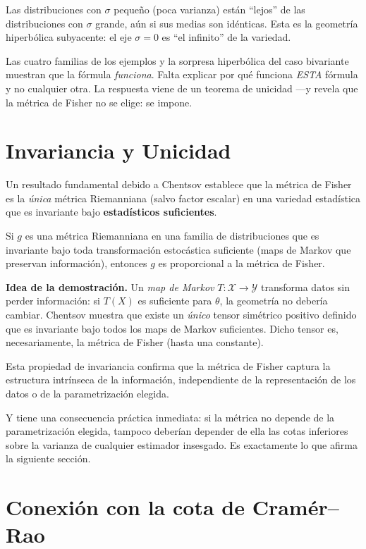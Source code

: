 Las distribuciones con $\sigma$ pequeño (poca varianza) están ``lejos'' de las distribuciones con $\sigma$ grande, aún si sus medias son idénticas. Esta es la geometría hiperbólica subyacente: el eje $\sigma = 0$ es ``el infinito'' de la variedad.

Las cuatro familias de los ejemplos y la sorpresa hiperbólica del caso bivariante muestran que la fórmula \emph{funciona}. Falta explicar por qué funciona \emph{ESTA} fórmula y no cualquier otra. La respuesta viene de un teorema de unicidad ---y revela que la métrica de Fisher no se elige: se impone.

\section{Invariancia y Unicidad}

Un resultado fundamental debido a Chentsov \cite{chentsov1982statistical} establece que la métrica de Fisher es la \emph{única} métrica Riemanniana (salvo factor escalar) en una variedad estadística que es invariante bajo \textbf{estadísticos suficientes}.

\begin{theorem}[Chentsov, 1972]
	Si $g$ es una métrica Riemanniana en una familia de distribuciones que es invariante bajo toda transformación estocástica suficiente (maps de Markov que preservan información), entonces $g$ es proporcional a la métrica de Fisher.
\end{theorem}

\textbf{Idea de la demostración.} Un \emph{map de Markov} $T : \mathcal{X} \to \mathcal{Y}$ transforma datos sin perder información: si $T(X)$ es suficiente para $\theta$, la geometría no debería cambiar. Chentsov muestra que existe un \emph{único} tensor simétrico positivo definido que es invariante bajo todos los maps de Markov suficientes. Dicho tensor es, necesariamente, la métrica de Fisher (hasta una constante).

Esta propiedad de invariancia confirma que la métrica de Fisher captura la estructura intrínseca de la información, independiente de la representación de los datos o de la parametrización elegida.

Y tiene una consecuencia práctica inmediata: si la métrica no depende de la parametrización elegida, tampoco deberían depender de ella las cotas inferiores sobre la varianza de cualquier estimador insesgado. Es exactamente lo que afirma la siguiente sección.

\section{Conexión con la cota de Cramér--Rao}


